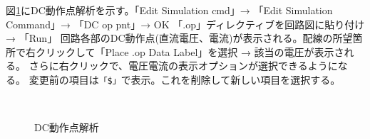     図\ref{dousaten}にDC動作点解析を示す。「Edit Simulation cmd」→ 「Edit Simulation Command」→ 「DC op pnt」→ OK 「.op」ディレクティブを回路図に貼り付け → 「Run」
回路各部のDC動作点(直流電圧、電流)が表示される。配線の所望箇所で右クリックして「Place .op Data Label」を選択 → 該当の電圧が表示される。
    さらに右クリックで、電圧電流の表示オプションが選択できるようになる。
    変更前の項目は\verb|「$」|で表示。これを削除して新しい項目を選択する。
    \begin{figure}[htb]
      \begin{center}
      ~
      \caption{DC動作点解析}
      \label{dousaten}
      \end{center}
    \end{figure}
    \newpage
